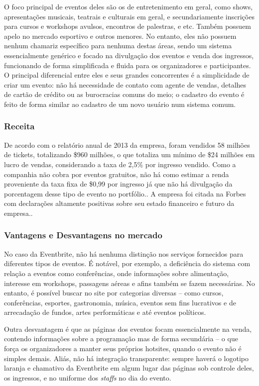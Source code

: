 \documentclass[12pt,a4paper,twoside,hyphens,english,brazil]{abntex2}
\begin{document}
O foco principal de eventos deles são os de entretenimento em geral, como shows, apresentações musicais, teatrais e culturais em geral, e secundariamente inscrições para cursos e workshops avulsos, encontros de palestras, e etc. Também possuem apelo no mercado esportivo e outros menores. No entanto, eles não possuem nenhum chamariz específico para nenhuma destas áreas, sendo um sistema essencialmente genérico e focado na divulgação dos eventos e venda dos ingressos, funcionando de forma simplificada e fluida para os organizadores e participantes. O principal diferencial entre eles e seus grandes concorrentes é a simplicidade de criar um evento: não há necessidade de contato com agente de vendas, detalhes de cartão de crédito ou as burocracias comuns do meio; o cadastro do evento é feito de forma similar ao cadastro de um novo usuário num sistema comum.

\subsubsection*{Receita}
De acordo com o relatório anual de 2013 da empresa, foram vendidos 58 milhões de tickets, totalizando \$960 milhões, o que totaliza um mínimo de \$24 milhões em lucro de vendas, considerando a taxa de 2,5\% por ingresso vendido. Como a companhia não cobra por eventos gratuitos, não há como estimar a renda proveniente da taxa fixa de \$0,99 por ingresso já que não há divulgação da porcentagem desse tipo de evento no portfólio.\cite{eventbrite-lucro-tnw}. A empresa foi citada na Forbes com declarações altamente positivas sobre seu estado financeiro e futuro da empresa.\cite{eventbrite-lucro-forbes}.

\subsubsection*{Vantagens e Desvantagens no mercado}
No caso da Eventbrite, não há nenhuma distinção nos serviços fornecidos para diferentes tipos de eventos. É notável, por exemplo, a deficiência do sistema com relação a eventos como conferências, onde informações sobre alimentação, interesse em workshops, passagens aéreas e afins também se fazem necessárias\cite{eventbrite-review}. No entanto, é possível buscar no site por categorias diversas -- como cursos, conferências, esportes, gastronomia, música, eventos sem fins lucrativos e de arrecadação de fundos, artes performáticas e até eventos políticos.

Outra desvantagem é que as páginas dos eventos focam essencialmente na venda, contendo informações sobre a programação mas de forma secundária -- o que força os organizadores a manter seus próprios hotsites, quando o evento não é simples demais. Aliás, não há integração transparente: sempre haverá o logotipo laranja e chamativo da Eventbrite em algum lugar das páginas sob controle deles, os ingressos, e no uniforme dos \emph{staffs} no dia do evento.
\end{document}

